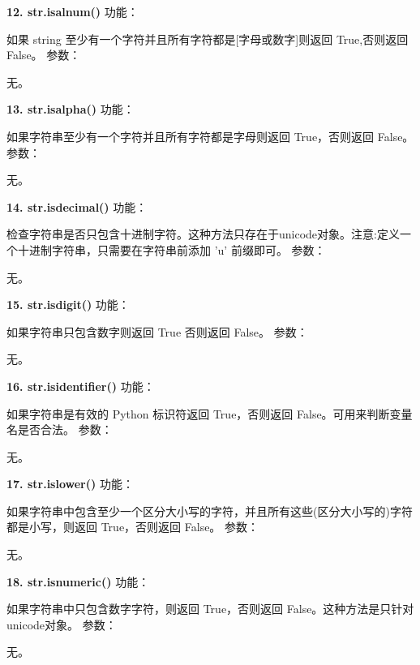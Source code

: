 \documentclass{book}
\begin{document}
\begin{CJK}{UTF8}{gbsn}
\noindent \textbf{12. str.isalnum()} \newline
功能：\par 如果 string 至少有一个字符并且所有字符都是[字母或数字]则返回 True,否则返回 False。\newline
参数：\par 无。
\newline

\noindent \textbf{13. str.isalpha()} \newline
功能：\par 如果字符串至少有一个字符并且所有字符都是字母则返回 True，否则返回 False。\newline
参数：\par 无。
\newline

\noindent \textbf{14. str.isdecimal()} \newline
功能：\par 检查字符串是否只包含十进制字符。这种方法只存在于unicode对象。注意:定义一个十进制字符串，只需要在字符串前添加 'u' 前缀即可。\newline
参数：\par 无。
\newline

\noindent \textbf{15. str.isdigit()} \newline
功能：\par 如果字符串只包含数字则返回 True 否则返回 False。\newline
参数：\par 无。
\newline

\newpage
\noindent \textbf{16. str.isidentifier()} \newline
功能：\par 如果字符串是有效的 Python 标识符返回 True，否则返回 False。可用来判断变量名是否合法。\newline
参数：\par 无。
\newline

\noindent \textbf{17. str.islower()} \newline
功能：\par 如果字符串中包含至少一个区分大小写的字符，并且所有这些(区分大小写的)字符都是小写，则返回 True，否则返回 False。\newline
参数：\par 无。
\newline

\noindent \textbf{18. str.isnumeric()} \newline
功能：\par 如果字符串中只包含数字字符，则返回 True，否则返回 False。这种方法是只针对unicode对象。\newline
参数：\par 无。
\newline


\end{CJK}
\end{document}
